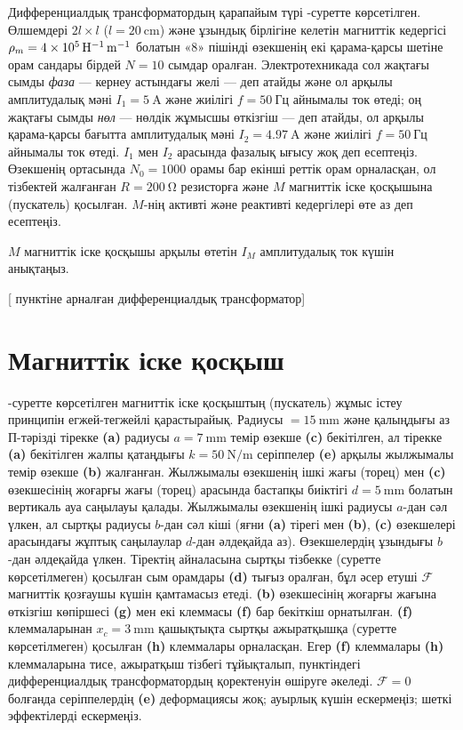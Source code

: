 Дифференциалдық трансформатордың қарапайым түрі -суретте көрсетілген. Өлшемдері $2l\times l$ ($l=\qty{20}{\cm}$) және ұзындық бірлігіне келетін магниттік кедергісі $\rho_m=\qty{4e5}{\per\H\per\m}$ болатын «8» пішінді өзекшенің екі қарама-қарсы шетіне орам сандары бірдей $N=10$ сымдар оралған. Электротехникада сол жақтағы сымды \textit{фаза} --- кернеу астындағы желі --- деп атайды және ол арқылы амплитудалық мәні $I_1=\qty{5}{\A}$ және жиілігі $f=\qty{50}{Гц}$ айнымалы ток өтеді; оң жақтағы сымды \textit{нөл} --- нөлдік жұмысшы өткізгіш --- деп атайды, ол арқылы қарама-қарсы бағытта амплитудалық мәні $I_2=\qty{4.97}{\A}$ және жиілігі $f=\qty{50}{Гц}$ айнымалы ток өтеді. $I_1$ мен $I_2$ арасында фазалық ығысу жоқ деп есептеңіз. Өзекшенің ортасында $N_0=1000$ орамы бар екінші реттік орам орналасқан, ол тізбектей жалғанған $R=\qty{200}{\ohm}$ резисторға және $M$ магниттік іске қосқышына (пускатель) қосылған. $M$-нің активті және реактивті кедергілері өте аз деп есептеңіз.
\begin{task}
    \item $M$ магниттік іске қосқышы арқылы өтетін $I_M$ амплитудалық ток күшін анықтаңыз.
\end{task}

[ пунктіне арналған дифференциалдық трансформатор]

\part{Магниттік іске қосқыш}

-суретте көрсетілген магниттік іске қосқыштың (пускатель) жұмыс істеу принципін егжей-тегжейлі қарастырайық. Радиусы $=\qty{15}{\mm}$ және қалыңдығы аз П-тәрізді тірекке \textbf{(a)} радиусы $a=\qty{7}{\mm}$ темір өзекше \textbf{(c)} бекітілген, ал тірекке \textbf{(a)} бекітілген жалпы қатаңдығы $k=\qty{50}{\N\per\m}$ серіппелер \textbf{(e)} арқылы жылжымалы темір өзекше \textbf{(b)} жалғанған. Жылжымалы өзекшенің ішкі жағы (торец) мен \textbf{(c)} өзекшесінің жоғарғы жағы (торец) арасында бастапқы биіктігі $d=\qty{5}{\mm}$ болатын вертикаль ауа саңылауы қалады. Жылжымалы өзекшенің ішкі радиусы $a$-дан сәл үлкен, ал сыртқы радиусы $b$-дан сәл кіші (яғни \textbf{(a)} тірегі мен \textbf{(b)}, \textbf{(c)} өзекшелері арасындағы жұптық саңылаулар $d$-дан әлдеқайда аз). Өзекшелердің ұзындығы $b$-дан әлдеқайда үлкен. Тіректің айналасына сыртқы тізбекке (суретте көрсетілмеген) қосылған сым орамдары \textbf{(d)} тығыз оралған, бұл әсер етуші $\mathcal F$ магниттік қозғаушы күшін қамтамасыз етеді. \textbf{(b)} өзекшесінің жоғарғы жағына өткізгіш көпіршесі \textbf{(g)} мен екі клеммасы \textbf{(f)} бар бекіткіш орнатылған. \textbf{(f)} клеммаларынан $x_c=\qty{3}{\mm}$ қашықтықта сыртқы ажыратқышқа (суретте көрсетілмеген) қосылған \textbf{(h)} клеммалары орналасқан. Егер \textbf{(f)} клеммалары \textbf{(h)} клеммаларына тисе, ажыратқыш тізбегі тұйықталып,  пунктіндегі дифференциалдық трансформатордың қоректенуін өшіруге әкеледі. $\mathcal F=0$ болғанда серіппелердің \textbf{(e)} деформациясы жоқ; ауырлық күшін ескермеңіз; шеткі эффектілерді ескермеңіз.

